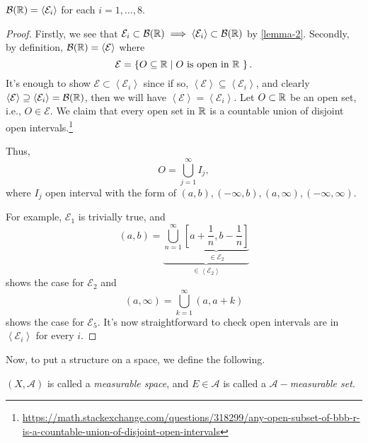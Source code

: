 \begin{proposition}
	\(\mathcal{B} (\mathbb{\MakeUppercase{R}} ) = \left<\mathcal{E}_{i}\right> \) for each \(i = 1, \ldots, 8\).
\end{proposition}
\begin{proof}
	Firstly, we see that \(\mathcal{E} _{i}\subset \mathcal{B} (\mathbb{\MakeUppercase{R}} ) \implies \left<\mathcal{E} _{i}\right>\subset \mathcal{B} (\mathbb{\MakeUppercase{R}} )\) by \autoref{lemma-2}.
	Secondly, by definition, \(\mathcal{B} (\mathbb{\MakeUppercase{R}} ) = \left<\mathcal{E} \right>\) where
	\[
		\mathcal{E} = \left\{O\subseteq \mathbb{\MakeUppercase{R}}\mid O \text{ is open in \(\mathbb{\MakeUppercase{R}}\) } \right\}.
	\]
	It's enough to show \(\mathcal{E} \subset \left<\mathcal{E} _{i}\right>\) since if so, \(\left<\mathcal{E} \right>\subseteq \left<\mathcal{E} _{i}\right>\), and clearly
	\(\left< \mathcal{E}  \right> \supseteq \left< \mathcal{E}_{i} \right> = \mathcal{B} (\mathbb{\MakeUppercase{R}}) \), then we will have
	\(\left< \mathcal{E}\right> = \left< \mathcal{E} _{i} \right> \). Let \(O\subset \mathbb{\MakeUppercase{R}} \) be an open set, i.e., \(O\in\mathcal{E}\).
	We claim that every open set in \(\mathbb{\MakeUppercase{R}} \) is a countable union of disjoint open intervals.\footnote{\url{https://math.stackexchange.com/questions/318299/any-open-subset-of-bbb-r-is-a-countable-union-of-disjoint-open-intervals}}

	Thus,
	\[
		O = \bigcup\limits_{j=1}^{\infty} I_{j},
	\]
	where \(I_{j}\) open interval with the form of \((a, b), (-\infty, b), (a, \infty), (-\infty, \infty)\).

	For example, \(\mathcal{E} _1\) is trivially true, and
	\[
		(a, b) = \underbrace{\bigcup\limits_{n=1}^{\infty} \underbrace{[a+\frac{1}{n}, b-\frac{1}{n}]}_{\in \mathcal{E}_2}}_{\in\left<\mathcal{E} _2\right>}
	\]
	shows the case for \(\mathcal{E} _2\) and
	\[
		(a, \infty) = \bigcup\limits_{k=1}^{\infty} (a, a+k)
	\]
	shows the case for \(\mathcal{E} _5\). It's now straightforward to check open intervals are in \(\left<\mathcal{E} _{i}\right>\) for every \(i\).
\end{proof}

Now, to put a structure on a space, we define the following.
\begin{definition}
	\((X, \mathcal{A})\) is called a \emph{measurable space}, and \(E\in \mathcal{A} \) is called a \emph{\(\mathcal{A}-\)measurable set}.
\end{definition}

